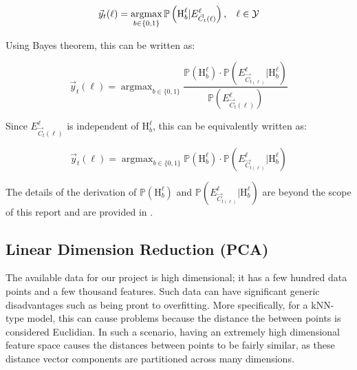 \documentclass[11pt]{article}
\DeclareMathOperator*{\argmax}{argmax} %
\begin{document}
\begin{equation}
\vec{y}_t(\ell) = \argmax_{b \in \{0, 1\}} \mathbb{P}\left(\textrm{H}_b^\ell | E_{\vec{C}_t(\ell)}^\ell\right), \textrm{\hspace{0.3cm}}\ell \in \mathcal{Y} 
\end{equation}

Using Bayes theorem, this can be written as:

\begin{equation}
\vec{y}_t(\ell) = \argmax_{b \in \{0,1\}} \frac{\mathbb{P}\left(\textrm{H}_b^\ell\right) \cdot \mathbb{P}\left(E_{\vec{C}_{t(\ell)}}^\ell | \textrm{H}_b^\ell\right)}{\mathbb{P}\left(E_{\vec{C}_t(\ell)}^\ell \right)} 
\end{equation}

Since $E_{\vec{C}_t(\ell)}^\ell$ is independent of $\textrm{H}_b^\ell$, this can be equivalently written as: 

\begin{equation}
\vec{y}_t(\ell) = \argmax_{b \in \{0, 1\}}\mathbb{P}\left(\textrm{H}_b^\ell\right) \cdot \mathbb{P}\left(E_{\vec{C}_{t(\ell)}}^\ell | \textrm{H}_b^\ell\right)
\end{equation}

The details of the derivation of $\mathbb{P}\left(\textrm{H}_b^\ell\right)$ and $\mathbb{P}\left(E_{\vec{C}_{t(\ell)}}^\ell | \textrm{H}_b^\ell\right)$ are beyond the scope of this report and are provided in \autocite{ZhangMulti-labelLazy}.

 

\subsection{Linear Dimension Reduction (PCA)}
The available data for our project is high dimensional; it has a few hundred data points and a few thousand features. Such data can have significant generic disadvantages such as being pront to overfitting. More specifically, for a kNN-type model, this can cause problems because the distance the between points is considered Euclidian. In such a scenario, having an extremely high dimensional feature space causes the distances between points to be fairly similar, as these distance vector components are partitioned across many dimensions. \autocite{nguyen2019ten} 
\end{document}
